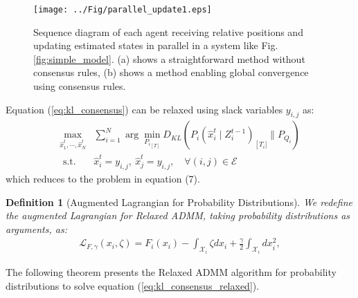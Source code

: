 \documentclass[a4paper,fleqn,10pt]{paper_template}
\newtheorem{definition}{Definition}
\begin{document}
\begin{figure}[t]
	\begin{center}
		\texttt{[image: ../Fig/parallel\_update1.eps]}
		\caption{Sequence diagram of each agent receiving relative positions and updating estimated states in parallel in a system like Fig. \ref{fig:simple_model}. (a) shows a straightforward method without consensus rules, (b) shows a method enabling global convergence using consensus rules.}
		\label{fig:parallel_update}
	\end{center}
	\vspace{-2mm}
\end{figure}

Equation (\ref{eq:kl_consensus}) can be relaxed using slack variables $y_{i,j}$ as:
\begin{equation}
\begin{aligned}
\max _{\hat x_{1}^{t}, \cdots, \hat x_{N}^{t}} & \sum_{i=1}^{N} \arg \min _{{P_{i}}_{[T]}} D_{K L}\left(P_{i}\left(\hat x_{i}^{t} \mid Z_{i}^{t-1}\right)_{\left[T_{i}]\right.} \| P_{Q_{i}} \right) \\
\text { s.t. } & \hat x_{i}^{t}=y_{i,j}, \:\hat x_{j}^{t}=y_{i,j}, \quad\forall(i, j) \in \mathcal{E}
\label{eq:kl_consensus_relaxed}
\end{aligned}
\end{equation}
which reduces to the problem in equation (7).

\begin{definition}[Augmented Lagrangian for Probability Distributions]
We redefine the augmented Lagrangian for Relaxed ADMM, taking probability distributions as arguments, as:
\begin{equation}
\begin{aligned}
 {\mathcal{ L}}_{F,\gamma}(x_i, \zeta) 
 = F_i(x_i) - \int_{{\mathcal{X}}_i}
\zeta dx_i + \frac{\gamma}{2}\int_{{\mathcal{X}}_i} dx_i^2,
\label{eq:relaxed_lagrangian}
\end{aligned}
\end{equation}
\end{definition}

The following theorem presents the Relaxed ADMM algorithm for probability distributions to solve equation (\ref{eq:kl_consensus_relaxed}).
\end{document}
